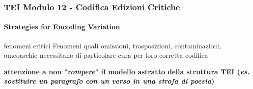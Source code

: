 \begin{frame}
    \frametitle{TEI Modulo 12 - Codifica Edizioni Critiche}
    \framesubtitle{Strategies for Encoding Variation}
    \addtocounter{nframe}{1}
    



    \begin{block}{fenomeni critici}
       Fenomeni quali omissioni, trasposizioni, contaminazioni, omeoarchie necessitano di particolare cura per loro corretta codifica
    \end{block}
    \textbf{attenzione a non "\textit{rompere}" il modello astratto della struttura TEI (\textit{es. sostituire un paragrafo con un verso in una strofa di poesia})}

\end{frame}

